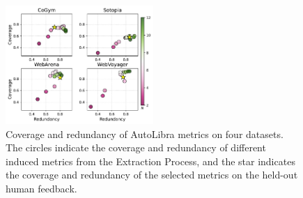 \begin{figure}
    \vspace{-24pt}
    \includegraphics[width=0.5\textwidth]{figs/four_datasets_grid.pdf}
    \vspace{-20pt}  
    \caption{Coverage and redundancy of AutoLibra metrics on four datasets. The circles indicate the coverage
    and redundancy of different induced metrics from the Extraction Process, and the star indicates the coverage
    and redundancy of the selected metrics on the held-out human feedback.}
    \label{fig:coverage-redundancy}
\end{figure}